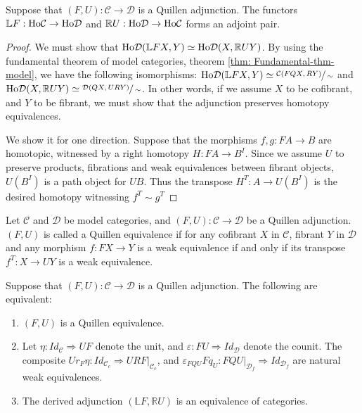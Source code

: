 \documentclass[../thesis.tex]{subfiles}
\begin{document}
            \begin{proposition}
                Suppose that $(F,U):\mathcal{C}\rightarrow\mathcal{D}$ is a Quillen adjunction. The functors $\mathbb{L}F:\tt{Ho}\mathcal{C}\rightarrow \tt{Ho}\mathcal{D}$ and $\mathbb{R}U: \tt{Ho}\mathcal{D}\rightarrow \tt{Ho}\mathcal{C}$ forms an adjoint pair.
            \end{proposition}

            \begin{proof}
                We must show that $\tt{Ho}\mathcal{D}(\mathbb{L}FX, Y) \simeq \tt{Ho}\mathcal{D}(X, \mathbb{R}UY)$. By using the fundamental theorem of model categories, theorem \ref{thm: Fundamental-thm-model}, we have the following isomorphisms: $\tt{Ho}\mathcal{D}(\mathbb{L}FX,Y)\simeq \sfrac{\mathcal{C}(FQX,RY)}{\sim}$ and $\tt{Ho}\mathcal{D}(X,\mathbb{R}UY)\simeq\sfrac{\mathcal{D}(QX,URY)}{\sim}$. In other words, if we assume $X$ to be cofibrant, and $Y$ to be fibrant, we must show that the adjunction preserves homotopy equivalences.

                We show it for one direction. Suppose that the morphisms $f,g:FA\rightarrow B$ are homotopic, witnessed by a right homotopy $H:FA\rightarrow B^I$. Since we assume $U$ to preserve products, fibrations and weak equivalences between fibrant objects, $U(B^I)$ is a path object for $UB$. Thus the transpose $H^T:A\rightarrow U(B^I)$ is the desired homotopy witnessing $f^T \sim g^T$
            \end{proof}

            \begin{definition}
                Let $\mathcal{C}$ and $\mathcal{D}$ be model categories, and $(F,U):\mathcal{C}\rightarrow\mathcal{D}$ be a Quillen adjunction. $(F,U)$ is called a Quillen equivalence if for any cofibrant $X$ in $\mathcal{C}$, fibrant $Y$ in $\mathcal{D}$ and any morphism $f:FX\rightarrow Y$ is a weak equivalence if and only if its transpose $f^T:X\rightarrow UY$ is a weak equivalence.
            \end{definition}

            \begin{proposition}\label{prop: Quill-Eq}
                Suppose that $(F,U):\mathcal{C}\rightarrow\mathcal{D}$ is a Quillen adjunction. The following are equivalent:
                \begin{enumerate}
                    \item $(F,U)$ is a Quillen equivalence.
                    \item Let $\eta :Id_\mathcal{C}\Rightarrow UF$ denote the unit, and $\varepsilon :FU\Rightarrow Id_\mathcal{D}$ denote the counit. The composite $Ur_{F}\eta : Id_{\mathcal{C}_c} \Rightarrow URF|_{\mathcal{C}_c}$, and $\varepsilon_{FQU}Fq_{U}:FQU|_{\mathcal{D}_f} \Rightarrow Id_{\mathcal{D}_f}$ are natural weak equivalences.
                    \item The derived adjunction $(\mathbb{L}F, \mathbb{R}U)$ is an equivalence of categories.
                \end{enumerate}
            \end{proposition}
\end{document}
